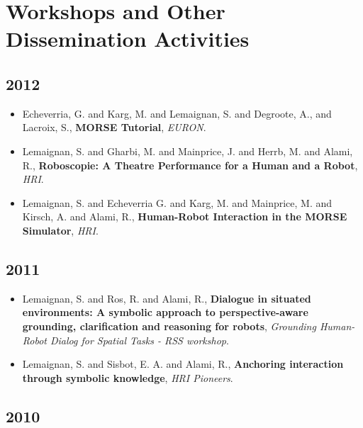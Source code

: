 \section{Workshops and Other Dissemination Activities}

\subsection {2012}

\begin{itemize}
    \item{Echeverria, G. and Karg, M. and Lemaignan, S. and Degroote, A., and Lacroix, S., \textbf{MORSE Tutorial}, \textit{EURON}.}
    \item{Lemaignan, S. and Gharbi, M. and Mainprice, J. and Herrb, M. and Alami, R., \textbf{Roboscopie: A Theatre Performance for a Human and a Robot}, \textit{HRI}.}
    \item{Lemaignan, S. and Echeverria G. and Karg, M. and Mainprice, M. and Kirsch, A. and Alami, R., \textbf{Human-Robot Interaction in the MORSE Simulator}, \textit{HRI}.}
\end{itemize}

\subsection {2011}

\begin{itemize}
    \item{Lemaignan, S. and Ros, R. and Alami, R., \textbf{Dialogue in situated environments: A symbolic approach to perspective-aware grounding, clarification and reasoning for robots}, \textit{Grounding Human-Robot Dialog for Spatial Tasks - RSS workshop}.}
    \item{Lemaignan, S. and Sisbot, E. A. and Alami, R., \textbf{Anchoring interaction through symbolic knowledge}, \textit{HRI Pioneers}.}
\end{itemize}

\subsection {2010}

